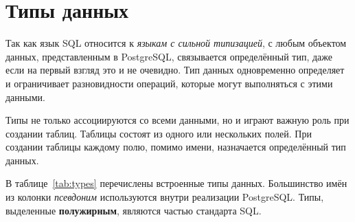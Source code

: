 \documentclass[a4paper,12pt,notitlepage,headsepline,pdftex]{scrartcl}
\begin{document}
  \pagebreak

\section{Типы данных}
  Так как язык SQL относится к \emph{языкам с сильной типизацией}, с любым
  объектом данных, представленным в PostgreSQL, связывается определённый тип,
  даже если на первый взгляд это и не очевидно.
  Тип данных одновременно определяет и ограничивает разновидности операций,
  которые могут выполняться с этими данными.

  Типы не только ассоциируются со всеми данными, но и играют важную роль при
  создании таблиц.
  Таблицы состоят из одного или нескольких полей.
  При создании таблицы каждому полю, помимо имени, назначается определённый
  тип данных.

  В таблице~\ref{tab:types} перечислены встроенные типы данных.
  Большинство имён из колонки \emph{псевдоним} используются внутри реализации
  PostgreSQL.
  Типы, выделенные \textbf{полужирным}, являются частью стандарта
  SQL.\cite{upandrunning}
\end{document}
